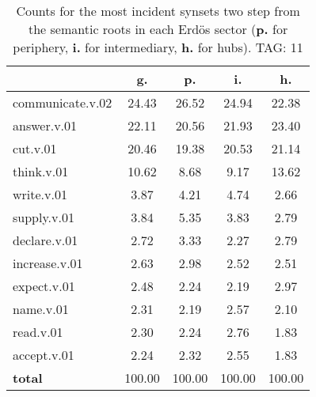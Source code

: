 \begin{table}[h!]
\begin{center}
\begin{tabular}{| l || c | c | c | c |}\hline
 & {\bf g.} & {\bf p.} & {\bf i.} & {\bf h.} \\\hline\hline
communicate.v.02 & 24.43  & 26.52  & 24.94  & 22.38 \\\hline
answer.v.01 & 22.11  & 20.56  & 21.93  & 23.40 \\\hline
cut.v.01 & 20.46  & 19.38  & 20.53  & 21.14 \\\hline
think.v.01 & 10.62  & 8.68  & 9.17  & 13.62 \\\hline
write.v.01 & 3.87  & 4.21  & 4.74  & 2.66 \\\hline
supply.v.01 & 3.84  & 5.35  & 3.83  & 2.79 \\\hline
declare.v.01 & 2.72  & 3.33  & 2.27  & 2.79 \\\hline
increase.v.01 & 2.63  & 2.98  & 2.52  & 2.51 \\\hline
expect.v.01 & 2.48  & 2.24  & 2.19  & 2.97 \\\hline
name.v.01 & 2.31  & 2.19  & 2.57  & 2.10 \\\hline
read.v.01 & 2.30  & 2.24  & 2.76  & 1.83 \\\hline
accept.v.01 & 2.24  & 2.32  & 2.55  & 1.83 \\\hline\hline
{{\bf total}} & 100.00  & 100.00  & 100.00  & 100.00 \\\hline
\end{tabular}
\caption{Counts for the most incident synsets two step from the semantic roots in each Erd\"os sector ({\bf p.} for periphery, {\bf i.} for intermediary, {\bf h.} for hubs). TAG: 11}
\end{center}
\end{table}